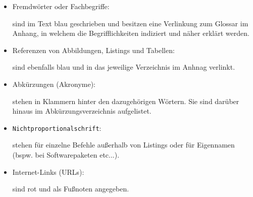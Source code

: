 \begin{itemize}
  \item Fremdwörter oder Fachbegriffe:

sind im Text blau geschrieben und besitzen eine Verlinkung zum Glossar im Anhang, in welchem die Begrifflichkeiten indiziert und näher erklärt werden.

  \item Referenzen von Abbildungen, Listings und Tabellen:
  
sind ebenfalls blau und in das jeweilige Verzeichnis im Anhnag verlinkt. 


  \item Abkürzungen (Akronyme):

stehen in Klammern hinter den dazugehörigen Wörtern. Sie sind darüber hinaus im Abkürzungsverzeichnis aufgelistet.

  \item \texttt{Nichtproportionalschrift}:

stehen für einzelne Befehle außerhalb von Listings oder für Eigennamen (bspw. bei Softwarepaketen etc...).

  \item Internet-Links (URLs):

sind rot und als Fußnoten angegeben.
\end{itemize}